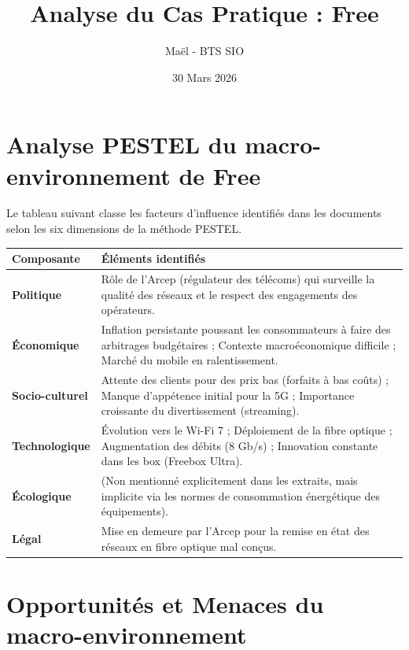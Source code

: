 \documentclass{article}
\title{Analyse du Cas Pratique : Free}
\author{Maël - BTS SIO}
\date{30 Mars 2026}
\begin{document}
\maketitle

\section{Analyse PESTEL du macro-environnement de Free}

Le tableau suivant classe les facteurs d'influence identifiés dans les documents selon les six dimensions de la méthode PESTEL.

\begin{table}[h]
\small
\begin{tabularx}{\textwidth}{l|X}
\toprule
\textbf{Composante} & \textbf{Éléments identifiés} \\
\midrule
\textbf{Politique} & Rôle de l'Arcep (régulateur des télécoms) qui surveille la qualité des réseaux et le respect des engagements des opérateurs. \\
\midrule
\textbf{Économique} & Inflation persistante poussant les consommateurs à faire des arbitrages budgétaires ; Contexte macroéconomique difficile ; Marché du mobile en ralentissement. \\
\midrule
\textbf{Socio-culturel} & Attente des clients pour des prix bas (forfaits à bas coûts) ; Manque d'appétence initial pour la 5G ; Importance croissante du divertissement (streaming). \\
\midrule
\textbf{Technologique} & Évolution vers le Wi-Fi 7 ; Déploiement de la fibre optique ; Augmentation des débits (8 Gb/s) ; Innovation constante dans les box (Freebox Ultra). \\
\midrule
\textbf{Écologique} & (Non mentionné explicitement dans les extraits, mais implicite via les normes de consommation énergétique des équipements). \\
\midrule
\textbf{Légal} & Mise en demeure par l'Arcep pour la remise en état des réseaux en fibre optique mal conçus. \\
\bottomrule
\end{tabularx}
\end{table}

\section{Opportunités et Menaces du macro-environnement}
\end{document}
